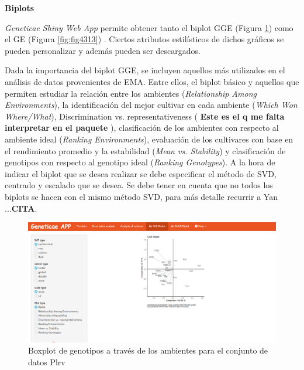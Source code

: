 \textbf{Biplots}

\emph{Geneticae Shiny Web App} permite obtener tanto el biplot GGE (Figura \ref{fig:fig4312}) como el GE (Figura \ref{fig:fig4313}) . Ciertos atributos estilísticos de dichos gráficos se pueden personalizar y además pueden ser descargados.

Dada la importancia del biplot GGE, se incluyen aquellos más utilizados en el análisis de datos provenientes de EMA. Entre ellos, el biplot básico y aquellos que permiten estudiar la relación entre los ambientes (\emph{Relationship Among Environments}), la identificación del mejor cultivar en cada ambiente (\emph{Which Won Where/What}), Discrimination vs. representativeness ( \textbf{Este es el q me falta interpretar en el paquete} ), clasificación de los ambientes con respecto al ambiente ideal (\emph{Ranking Environments}), evaluación de los cultivares con base en el rendimiento promedio y la estabilidad (\emph{Mean vs. Stability}) y  clasificación de genotipos con respecto al genotipo ideal (\emph{Ranking Genotypes}). A la hora de indicar el biplot que se desea realizar se debe especificar el método de SVD, centrado y escalado que se desea. Se debe tener en cuenta que no todos los biplots se hacen con el mismo método SVD, para más detalle recurrir a Yan ...\textbf{CITA}.


\begin{figure}[H]
	\begin{center}
		\includegraphics[width=16cm]{./Graficos/GGE.png}
	\end{center}
	\caption{Boxplot de genotipos a través de los ambientes para el conjunto de datos Plrv}
	\label{fig:fig4312}
\end{figure}


